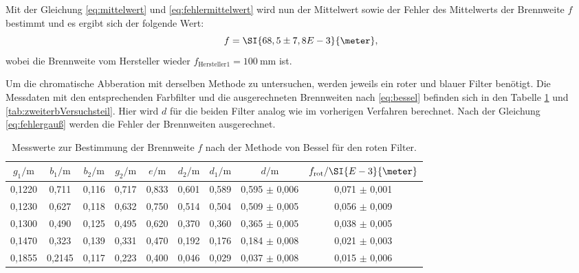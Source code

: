 Mit der Gleichung \ref{eq:mittelwert} und \ref{eq:fehlermittelwert} wird nun der Mittelwert sowie der Fehler des Mittelwerts der Brennweite $f$ bestimmt und es ergibt sich der folgende Wert:
\begin{equation*}
f = \SI{68,5 \pm 7,8 E-3}{\meter},
\end{equation*}
wobei die Brennweite vom Hersteller wieder $f_\text{Hersteller1} =  \SI{100}{\milli\meter}$ ist. 

Um die chromatische Abberation mit derselben Methode zu untersuchen, werden jeweils ein roter und blauer Filter benötigt. Die Messdaten mit den entsprechenden Farbfilter und die ausgerechneten Brennweiten nach \ref{eq:bessel} befinden sich in den Tabelle \ref{tab:zweiteraVersuchsteil} und \ref{tab:zweiterbVersuchsteil}. Hier wird $d$ für die beiden Filter analog wie im vorherigen Verfahren berechnet. Nach der Gleichung \ref{eq:fehlergauß} werden die Fehler der Brennweiten ausgerechnet.

\begin{table}[htpb]
	\centering
	\caption{Messwerte zur Bestimmung der Brennweite $f$ nach der Methode von Bessel für den roten Filter.}
	\label{tab:zweiteraVersuchsteil}
	\begin{tabular}{c c c c c c c c c}
		\toprule
		$g_1 / \si{\meter}$ & $b_1 / \si{\meter}$ & $b_2 /\si{\meter}$ & $g_2/ \si{\meter}$ & $e / \si{\meter}$ & $d_2 / \si{\meter}$ & $d_1 / \si{\meter}$ & $d / \si{\meter}$& $f_\text{rot} / \SI{E-3}{\meter}$  \\
		\midrule
  		0,1220 & 0,711 &0,116 & 0,717 & 0,833 & 0,601 & 0,589 & 0,595 $\pm$ 0,006 & 0,071 $\pm$ 0,001\\
  		0,1230 & 0,627 &0,118 & 0,632 & 0,750 & 0,514 & 0,504 & 0,509 $\pm$ 0,005 & 0,056 $\pm$ 0,009\\
  		0,1300 & 0,490 &0,125 & 0,495 & 0,620 & 0,370 & 0,360 & 0,365 $\pm$ 0,005 & 0,038 $\pm$ 0,005\\
  		0,1470 & 0,323 &0,139 & 0,331 & 0,470 & 0,192 & 0,176 & 0,184 $\pm$ 0,008 & 0,021 $\pm$ 0,003\\
  		0,1855 & 0,2145&0,117 & 0,223 & 0,400 & 0,046 & 0,029 & 0,037 $\pm$ 0,008 & 0,015 $\pm$ 0,006 \\
		\bottomrule
	\end{tabular}
\end{table}

